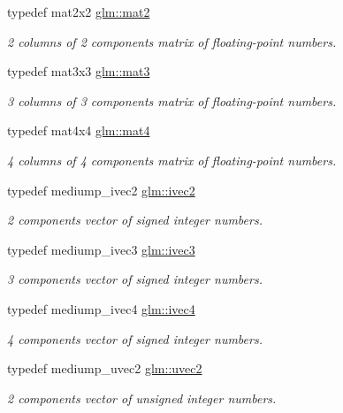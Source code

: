 \begin{DoxyCompactItemize}
typedef mat2x2 \hyperlink{group__core__types_ga8357ec0aab6f8cf69313592492663c3f}{glm\-::mat2}
\begin{DoxyCompactList}\small\item\em 2 columns of 2 components matrix of floating-\/point numbers. \end{DoxyCompactList}\item 
typedef mat3x3 \hyperlink{group__core__types_gadfaff2a7dce5cbf4e77a47ecea42ac5b}{glm\-::mat3}
\begin{DoxyCompactList}\small\item\em 3 columns of 3 components matrix of floating-\/point numbers. \end{DoxyCompactList}\item 
typedef mat4x4 \hyperlink{group__core__types_ga7dcd2365c2e368e6af5b7adeb6a9c8df}{glm\-::mat4}
\begin{DoxyCompactList}\small\item\em 4 columns of 4 components matrix of floating-\/point numbers. \end{DoxyCompactList}\item 
typedef mediump\-\_\-ivec2 \hyperlink{group__core__types_ga606b9d298d8aaa55c449182c340b4622}{glm\-::ivec2}
\begin{DoxyCompactList}\small\item\em 2 components vector of signed integer numbers. \end{DoxyCompactList}\item 
typedef mediump\-\_\-ivec3 \hyperlink{group__core__types_ga620442eba2e3b49317b24fd6d141b0f8}{glm\-::ivec3}
\begin{DoxyCompactList}\small\item\em 3 components vector of signed integer numbers. \end{DoxyCompactList}\item 
typedef mediump\-\_\-ivec4 \hyperlink{group__core__types_ga997dbad029105eea19ccd8a1455a6fe3}{glm\-::ivec4}
\begin{DoxyCompactList}\small\item\em 4 components vector of signed integer numbers. \end{DoxyCompactList}\item 
typedef mediump\-\_\-uvec2 \hyperlink{group__core__types_gad0643cb47b927024ccf4979b0e9a903d}{glm\-::uvec2}
\begin{DoxyCompactList}\small\item\em 2 components vector of unsigned integer numbers. \end{DoxyCompactList}\item 

\end{DoxyCompactItemize}
